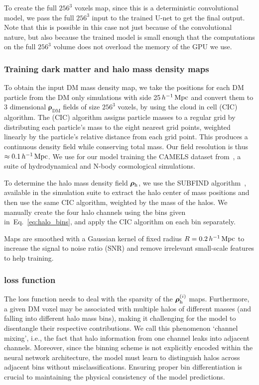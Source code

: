 To create the full $256^3$ voxels map, since this is a deterministic convolutional model, we pass the full $256^3$ input to the trained U-net to get the final output. Note that this is possible in this case not just because of the convolutional nature, but also because the trained model is small enough that the computations on the full $256^3$ volume does not overload the memory of the GPU we use. 

\subsubsection{Training dark matter and halo mass density maps}

To obtain the input DM mass density map, we take the positions for each DM particle from the DM only simulations with side 25$\,h^{-1}\,\mathrm{Mpc}$ and convert them to 3 dimensional $\boldsymbol{\rho}_\text{DM}$ fields of size $256^3$ voxels, by using the cloud in cell (CIC) algorithm. The (CIC) algorithm assigns particle masses to a regular grid by distributing each particle’s mass to the eight nearest grid points, weighted linearly by the particle’s relative distance from each grid point. This produces a continuous density field while conserving total mass. Our field resolution is thus $\approx 0.1\,h^{-1}\,\mathrm{Mpc}$. We use for our model training the CAMELS dataset from~\citet{villaescusa-navarro_camels_2022}, a suite of hydrodynamical and N-body cosmological simulations.

To determine the halo mass density field $\boldsymbol{\rho}_\mathrm{h}$, we use the SUBFIND algorithm~\citep{springel_populating_2000}, available in the simulation suite to extract the halo center of mass positions and then use the same CIC algorithm, weighted by the mass of the halos. We manually create the four halo channels using the bins given in~Eq.~\eqref{eq:halo_bins}, and apply the CIC algorithm on each bin separately.


Maps are smoothed with a Gaussian kernel of fixed radius $R = 0.2\,h^{-1}\,\mathrm{Mpc}$ to increase the signal to noise ratio (SNR) and remove irrelevant small-scale features to help training.


\subsubsection{\HALOgen loss function}

The loss function needs to deal with the sparsity of the $\boldsymbol{\rho}_\mathrm{h}^{(i)}$ maps. Furthermore, a given DM voxel may be associated with multiple halos of different masses (and falling into different halo mass bins), making it challenging for the model to disentangle their respective contributions. We call this phenomenon `channel mixing', i.e., the fact that halo information from one channel leaks into adjacent channels. Moreover, since the binning scheme is not explicitly encoded within the neural network architecture, the model must learn to distinguish halos across adjacent bins without misclassifications.
Ensuring proper bin differentiation is crucial to maintaining the physical consistency of the model predictions.

